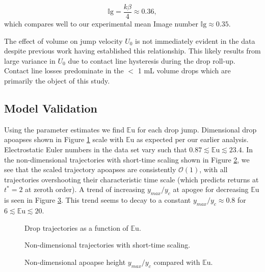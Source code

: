 \documentclass[aip,reprint, floatfix]{revtex4-1}
\begin{document}
\begin{equation*}
\mathbb{I}\mbox{g} = \frac{k \beta}{4} \approx 0.36,
\end{equation*}
which compares well to our experimental mean Image number $\mathbb{I}\mbox{g} \approx 0.35$.

The effect of volume on jump velocity $U_0$ is not immediately evident in the data despite previous work having established this relationship. \cite{attari_puddle_2016} This likely results from large variance in $U_0$ due to contact line hysteresis during the drop roll-up. Contact line losses predominate in the $<$ 1 mL volume drops which are primarily the object of this study.  

\subsection{Model Validation}
Using the parameter estimates we find $\mathbb{E}\mbox{u}$ for each drop jump. Dimensional drop apoapses shown in Figure \ref{fig:series_s_eu} scale with $\mathbb{E}\mbox{u}$ as expected per our earlier analysis. Electrostatic Euler numbers in the data set vary such that $0.87 \lesssim \mathbb{E}\mbox{u} \lesssim 23.4$. In the non-dimensional trajectories with short-time scaling shown in Figure \ref{fig:series_s_ds}, we see that the scaled trajectory apoapses are consistently $\mathcal{O}(1)$, with all trajectories overshooting their characteristic time scale (which predicts returns at $t^*  =2$ at zeroth order). A trend of increasing $y_{max}/y_c$ at apogee for decreasing $\mathbb{E}\mbox{u}$ is seen in Figure \ref{fig:yscale_trend}. This trend seems to decay to a constant $y_{max}/y_c \approx 0.8$ for $6 \lesssim \mathbb{E}\mbox{u} \lesssim 20$.
\begin{figure}[!htb]
    \centering
    \resizebox{0.5\textwidth}{!}{}
    \caption{Drop trajectories as a function of $\mathbb{E}\mbox{u}$.\label{fig:series_s_eu}}
\end{figure}
\begin{figure}[htb]
    \centering
    \resizebox{0.5\textwidth}{!}{}
    \caption{Non-dimensional trajectories with short-time scaling.\label{fig:series_s_ds}}
\end{figure}
\begin{figure}[htb]
    \centering
    \resizebox{0.5\textwidth}{!}{}
    \caption{Non-dimensional apoapse height $y_{max}/y_c$ compared with $\mathbb{E}\mbox{u}$.\label{fig:yscale_trend}}
\end{figure}
\end{document}
